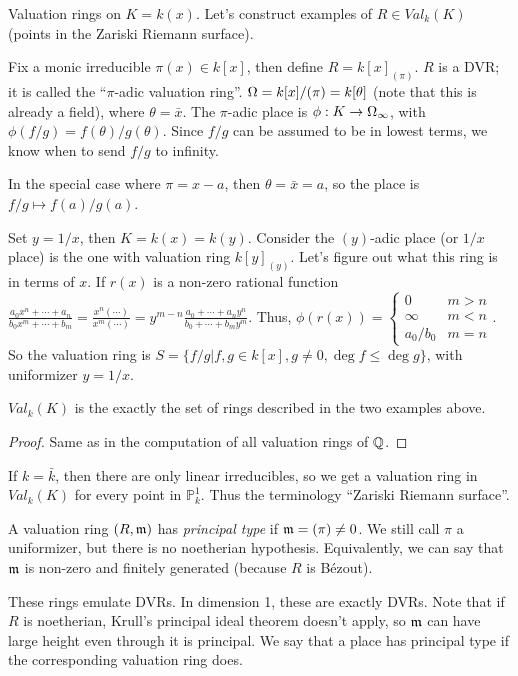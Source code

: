  Valuation rings on $K=k(x)$. Let's construct examples of $R\in Val_k(K)$ (points in
 the Zariski Riemann surface).
 \begin{example}
   Fix a monic irreducible $\pi(x)\in k[x]$, then define $R=k[x]_{(\pi)}$. $R$ is a DVR;
   it is called the ``$\pi$-adic valuation ring''. $\Omega =
   k[x]/(\pi) = k[\theta]$ (note that this is already a field), where $\theta = \bar x$.
   The $\pi$-adic place is $\phi:K\to \Omega_\infty$, with $\phi(f/g) = f(\theta)/g(\theta)$.
   Since $f/g$ can be assumed to be in lowest terms, we know when to send $f/g$ to
   infinity.

   In the special case where $\pi = x-a$, then $\theta = \bar x = a$, so the place is
   $f/g\mapsto f(a)/g(a)$.
 \end{example}
 \begin{example}
   Set $y = 1/x$, then $K=k(x)=k(y)$. Consider the $(y)$-adic place (or $1/x$ place) is
   the one with valuation ring $k[y]_(y)$. Let's figure out what this ring is in terms of
   $x$. If $r(x)$ is a non-zero rational function $\frac{a_0 x^n+\cdots+ a_n}{b_0x^m +\cdots
   +b_m} = \frac{x^n(\cdots)}{x^m(\cdots)} = y^{m-n} \frac{a_0+\cdots+ a_n y^n}{b_0 +\cdots
   +b_m y^m}$. Thus, $\phi(r(x)) =${\scriptsize $\begin{cases}
     0 & m> n\\
     \infty & m<n\\
     a_0/b_0 & m=n
   \end{cases}$}. So the valuation ring is $S=\{f/g|f,g\in k[x], g\neq 0, \deg f\le \deg
   g\}$, with uniformizer $y=1/x$.
 \end{example}
 \begin{theorem}
   $Val_k(K)$ is the exactly the set of rings described in the two examples above.
 \end{theorem}
 \begin{proof}
   Same as in the computation of all valuation rings of $\mathbb{Q}$.
 \end{proof}
 If $k=\bar k$, then there are only linear irreducibles, so we get a valuation ring in
 $Val_k(K)$ for every point in $\mathbb{P}^1_k$. Thus the terminology ``Zariski Riemann
 surface''.

 \begin{definition}
   A valuation ring $(R,\mathfrak{m})$ has \emph{principal type} if $\mathfrak{m} = (\pi)\neq 0$. We still
   call $\pi$ a uniformizer, but there is no noetherian hypothesis. Equivalently, we can
   say that $\mathfrak{m}$ is non-zero and finitely generated (because $R$ is B\'ezout).
 \end{definition}
 These rings emulate DVRs. In dimension 1, these are exactly DVRs. Note that if $R$ is
 noetherian, Krull's principal ideal theorem doesn't apply, so $\mathfrak{m}$ can have large height
 even through it is principal. We say that a place has principal type if the
 corresponding valuation ring does.

